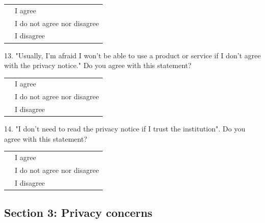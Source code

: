 \vspace{0.6cm}
\begin{center}
    \noindent\begin{tabularx}{0.8\textwidth}{ >{\centering\arraybackslash}X >{\raggedright\arraybackslash}X }
        {\huge $\circ$} & I agree \\[0.2cm]
        {\huge $\circ$} & I do not agree nor disagree \\[0.2cm]
        {\huge $\circ$} & I disagree
    \end{tabularx}
\end{center}
\vspace{0.6cm}

13. "Usually, I'm afraid I won't be able to use a product or service if I don't agree with the privacy notice." Do you agree with this statement?

\vspace{0.6cm}
\begin{center}
    \noindent\begin{tabularx}{0.8\textwidth}{ >{\centering\arraybackslash}X >{\raggedright\arraybackslash}X }
        {\huge $\circ$} & I agree \\[0.2cm]
        {\huge $\circ$} & I do not agree nor disagree \\[0.2cm]
        {\huge $\circ$} & I disagree
    \end{tabularx}
\end{center}
\vspace{0.6cm}

14. "I don't need to read the privacy notice if I trust the institution". Do you agree with this statement?

\vspace{0.6cm}
\begin{center}
    \noindent\begin{tabularx}{0.8\textwidth}{ >{\centering\arraybackslash}X >{\raggedright\arraybackslash}X }
        {\huge $\circ$} & I agree \\[0.2cm]
        {\huge $\circ$} & I do not agree nor disagree \\[0.2cm]
        {\huge $\circ$} & I disagree
    \end{tabularx}
\end{center}
\vspace{0.6cm}

\subsection*{Section 3: Privacy concerns}

